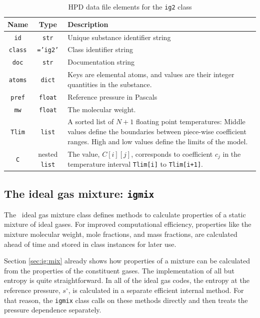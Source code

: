 \begin{table}
\centering
\caption{HPD data file elements for the \texttt{ig2} class}\label{tab:class:ig2}
\begin{tabular}{|ccp{2.5in}|}
\hline
Name & Type & Description\\
\hline
\texttt{id} & \texttt{str} & Unique substance identifier string\\
\texttt{class} & \texttt{='ig2'} & Class identifier string\\
\texttt{doc} & \texttt{str} & Documentation string\\
\hline
\texttt{atoms} & \texttt{dict} & Keys are elemental atoms, and values are their integer quantities in the substance.\\
\texttt{pref} & \texttt{float} & Reference pressure in Pascals\\
\texttt{mw} & \texttt{float} & The molecular weight.\\
\texttt{Tlim} & \texttt{list} & A sorted list of $N+1$ floating point temperatures: Middle values define the boundaries between piece-wise coefficient ranges.  High and low values define the limits of the model.\\
\texttt{C} & nested \texttt{list} & The value, $C[i][j]$, corresponds to coefficient $c_j$ in the temperature interval \texttt{Tlim[i]} to \texttt{Tlim[i+1]}.\\
\hline
\end{tabular}
\end{table}

\subsection{The ideal gas mixture: \texttt{igmix}}\label{sec:ig:igmix}

The \PM\ ideal gas mixture class defines methods to calculate properties of a static mixture of ideal gases.  For improved computational efficiency, properties like the mixture molecular weight, mole fractions, and mass fractions, are calculated ahead of time and stored in class instances for later use.

Section \ref{sec:ig:mix} already shows how properties of a mixture can be calculated from the properties of the constituent gases.  The implementation of all but entropy is quite straightforward.  In all of the ideal gas codes, the entropy at the reference pressure, $s^\circ$, is calculated in a separate efficient internal method.  For that reason, the \texttt{igmix} class calls on these methods directly and then treats the pressure dependence separately.

